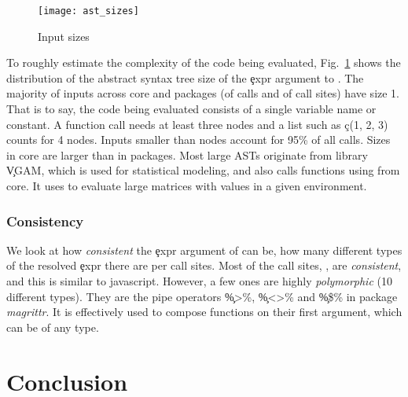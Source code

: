\documentclass[USenglish,cleveref, autoref, thm-restate]{lipics-v2019}
\begin{document}
\begin{figure}[!b]
	\centering
  \texttt{[image: ast\_sizes]}
  \caption{Input sizes} \label{fig:ast-size}
\end{figure}

To roughly estimate the complexity of the code being evaluated,
Fig.~\ref{fig:ast-size} shows the distribution of the abstract syntax tree
size of the \c{expr} argument to \eval. The majority of inputs across core
and packages (\NbAstOnePercent of \eval calls and \NbAstOneCallSitePercent
of call sites) have size 1. That is to say, the code being evaluated
consists of a single variable name or constant. A function call needs at
least three nodes and a list such as \c{c(1, 2, 3)} counts for 4
nodes. Inputs smaller than \AstSizeNineFive nodes account for 95\% of all
calls. Sizes in core are larger than in packages. Most large ASTs originate
from library \c{VGAM}, which is used for statistical modeling, and also calls functions using \eval from core. It uses
\eval to evaluate large matrices with values in a given environment.

\subsubsection{Consistency}

We look at how \emph{consistent} the \c{expr} argument of \eval can be, \ie
how many different types of the resolved \c{expr} there are per call
sites. Most of the call sites, \ie \PercentMonomorphic, are
\emph{consistent}, and this is similar to javascript. However, a few ones
are highly \emph{polymorphic} (10 different types). They are the pipe
operators \c{\%>\%}, \c{\%<>\%} and \c{\%\$\%} in package \emph{magrittr}. It
is effectively used to compose functions on their first argument, which can
be of any type.


\section{Conclusion}


\end{document}
